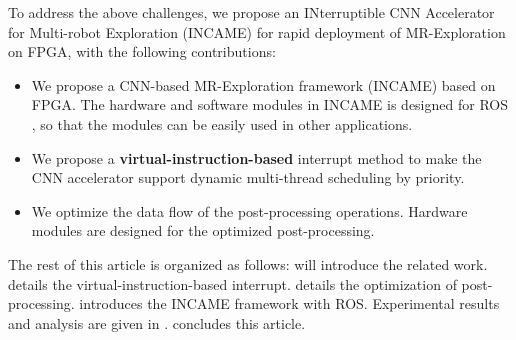 To address the above challenges, we propose an INterruptible CNN Accelerator for Multi-robot Exploration (INCAME) for rapid deployment of MR-Exploration on FPGA, with the following contributions:

\begin{itemize}
\item We propose a CNN-based MR-Exploration framework (INCAME) based on FPGA. The hardware and software modules in INCAME is designed for ROS \cite{quigley2009ros}, so that the modules can be easily used in other applications.
\item We propose a \textbf{virtual-instruction-based} interrupt method to make the CNN accelerator support dynamic multi-thread scheduling by priority.
\item We optimize the data flow of the post-processing operations. Hardware modules are designed for the optimized post-processing.
\end{itemize}

The rest of this article is organized as follows:  will introduce the related work.  details the {virtual-instruction-based} interrupt.  details the optimization of post-processing.  introduces the INCAME framework with ROS. Experimental results and analysis are given in .  concludes this article.